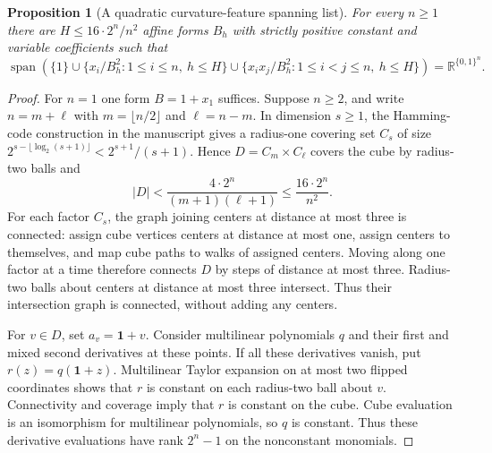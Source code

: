 \documentclass[11pt]{article}
\newtheorem{proposition}{Proposition}
\newcommand{\Qn}{\{0,1\}^n}
\begin{document}
\begin{proposition}[A quadratic curvature-feature spanning list]
For every $n\ge1$ there are $H\le 16\cdot 2^n/n^2$ affine forms
$B_h$ with strictly positive constant and variable coefficients such that
\[
 \operatorname{span}\left(\{1\}\cup
 \{x_i/B_h^2:1\le i\le n,\ h\le H\}\cup
 \{x_ix_j/B_h^2:1\le i<j\le n,\ h\le H\}\right)
 =\mathbb R^{\Qn}.
\]
\end{proposition}
\begin{proof}
For $n=1$ one form $B=1+x_1$ suffices. Suppose $n\ge2$, and
write $n=m+\ell$ with $m=\lfloor n/2\rfloor$ and $\ell=n-m$.
In dimension $s\ge1$, the Hamming-code construction in the manuscript
gives a radius-one covering set $C_s$ of size
$2^{s-\lfloor\log_2(s+1)\rfloor}<2^{s+1}/(s+1)$.
Hence $D=C_m\times C_\ell$ covers the cube by radius-two balls and
\[
 |D|<\frac{4\cdot2^n}{(m+1)(\ell+1)}
       \le\frac{16\cdot2^n}{n^2}.
\]
For each factor $C_s$, the graph joining centers at distance at most
three is connected: assign cube vertices centers at distance at most
one, assign centers to themselves, and map cube paths to walks of assigned
centers. Moving along one factor at a time therefore connects $D$ by
steps of distance at most three. Radius-two balls about centers at
distance at most three intersect. Thus their intersection graph is
connected, without adding any centers.

For $v\in D$, set $a_v=\mathbf1+v$. Consider multilinear polynomials
$q$ and their first and mixed second derivatives at these points.
If all these derivatives vanish, put $r(z)=q(\mathbf1+z)$.
Multilinear Taylor expansion on at most two flipped coordinates shows
that $r$ is constant on each radius-two ball about $v$. Connectivity
and coverage imply that $r$ is constant on the cube. Cube evaluation
is an isomorphism for multilinear polynomials, so $q$ is constant.
Thus these derivative evaluations have rank $2^n-1$ on the nonconstant
monomials.


\end{proof}
\end{document}
